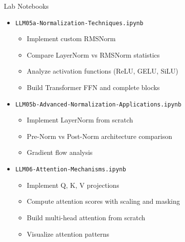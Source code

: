 \documentclass[aspectratio=169,10pt]{beamer}
\begin{document}
\begin{frame}{Lab Notebooks}
	\begin{itemize}
		\item \texttt{LLM05a-Normalization-Techniques.ipynb}
		      \begin{itemize}
			      \item Implement custom RMSNorm
			      \item Compare LayerNorm vs RMSNorm statistics
			      \item Analyze activation functions (ReLU, GELU, SiLU)
			      \item Build Transformer FFN and complete blocks
		      \end{itemize}

		      \vspace{0.2cm}
		\item \texttt{LLM05b-Advanced-Normalization-Applications.ipynb}
		      \begin{itemize}
			      \item Implement LayerNorm from scratch
			      \item Pre-Norm vs Post-Norm architecture comparison
			      \item Gradient flow analysis
		      \end{itemize}

		      \vspace{0.2cm}
		\item \texttt{LLM06-Attention-Mechanisms.ipynb}
		      \begin{itemize}
			      \item Implement Q, K, V projections
			      \item Compute attention scores with scaling and masking
			      \item Build multi-head attention from scratch
			      \item Visualize attention patterns
		      \end{itemize}
	\end{itemize}
\end{frame}
\end{document}
